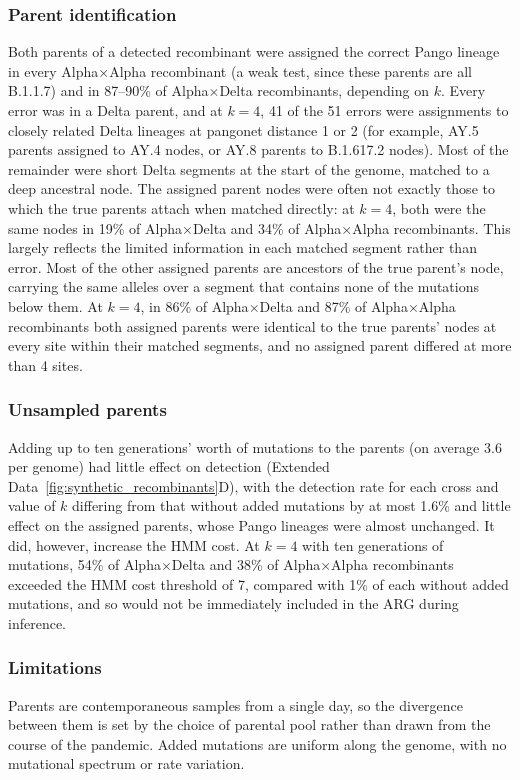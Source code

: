 \documentclass[12pt]{article}
\newcommand{\edref}[1]{Extended Data~\ref{#1}}
\begin{document}
\subsubsection{Parent identification}
Both parents of a detected recombinant were assigned the correct Pango lineage
in every Alpha$\times$Alpha recombinant (a weak test, since these parents
are all B.1.1.7) and in 87--90\% of Alpha$\times$Delta recombinants,
depending on $k$.
Every error was in a Delta parent, and at $k=4$, 41 of the 51 errors
were assignments to closely related Delta lineages at pangonet distance 1 or 2
(for example, AY.5 parents assigned to AY.4 nodes,
or AY.8 parents to B.1.617.2 nodes).
Most of the remainder were short Delta segments
at the start of the genome, matched to a deep ancestral node.
The assigned parent nodes were often not exactly those to which the true parents attach
when matched directly:
at $k=4$, both were the same nodes in 19\% of Alpha$\times$Delta
and 34\% of Alpha$\times$Alpha recombinants.
This largely reflects the limited information in each matched segment
rather than error. Most of the other assigned parents are ancestors of
the true parent's node, carrying the same alleles over a segment
that contains none of the mutations below them.
At $k=4$, in 86\% of Alpha$\times$Delta and 87\% of Alpha$\times$Alpha recombinants
both assigned parents were identical to the true parents' nodes
at every site within their matched segments,
and no assigned parent differed at more than 4 sites.

\subsubsection{Unsampled parents}
Adding up to ten generations' worth of mutations to the parents
(on average 3.6 per genome) had little effect on detection
(\edref{fig:synthetic_recombinants}D),
with the detection rate for each cross and value of $k$
differing from that without added mutations by at most 1.6\%
and little effect on the assigned parents, whose Pango lineages were almost unchanged.
It did, however, increase the HMM cost.
At $k=4$ with ten generations of mutations,
54\% of Alpha$\times$Delta and 38\% of Alpha$\times$Alpha recombinants
exceeded the HMM cost threshold of 7, compared with 1\% of each
without added mutations,
and so would not be immediately included in the ARG during inference.

\subsubsection{Limitations}
Parents are contemporaneous samples from a single day,
so the divergence between them is set by the choice of parental pool
rather than drawn from the course of the pandemic.
Added mutations are uniform along the genome,
with no mutational spectrum or rate variation.
\end{document}
